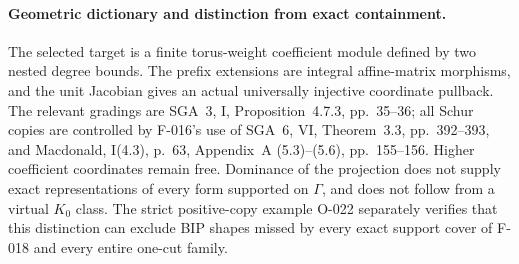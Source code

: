\paragraph{Geometric dictionary and distinction from exact containment.}
The selected target is a finite torus-weight coefficient
module defined by two nested degree bounds. The prefix
extensions are integral affine-matrix morphisms, and the
unit Jacobian gives an actual universally injective coordinate
pullback. The relevant gradings are SGA~3, I,
Proposition~4.7.3, pp.~35--36; all Schur copies are
controlled by F-016's use of SGA~6, VI, Theorem~3.3,
pp.~392--393, and Macdonald, I(4.3), p.~63, Appendix~A
(5.3)--(5.6), pp.~155--156.
Higher coefficient coordinates remain free. Dominance of
the projection does not supply exact representations of
every form supported on \(\Gamma\), and does not follow
from a virtual \(K_0\) class. The strict positive-copy
example O-022 separately verifies that this distinction
can exclude BIP shapes missed by every exact support cover
of F-018 and every entire one-cut family.
